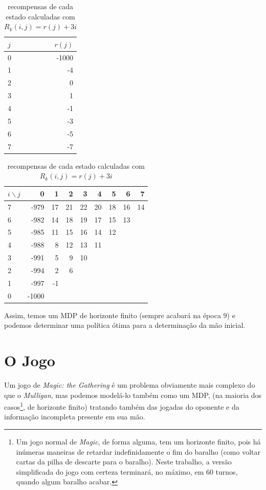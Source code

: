 \documentclass{book}
\begin{document}
\begin{table}[!h]
\parbox{.45\linewidth}{
\centering
\vspace{0.2cm}
\begin{tabular}{l|r}
$j$  & $r(j)$ \\ \hline
0 & -1000  \\
1 & -4     \\
2 & 0      \\
3 & 1      \\
4 & -1     \\
5 & -3    \\
6 & -5     \\
7 & -7
\end{tabular}
\caption{recompensas-base para $j = 0, \ldots, 7$}
\label{tab:rj}
}
\hfill
\parbox{.45\linewidth}{
\centering
\begin{tabular}{l|rrrrrrrr}
$i \backslash j$ & 0     & 1  & 2  & 3  & 4  & 5  & 6  & 7  \\ \hline
7 & -979  & 17 & 21 & 22 & 20 & 18 & 16 & 14 \\
6 & -982  & 14 & 18 & 19 & 17 & 15 & 13 &    \\
5 & -985  & 11 & 15 & 16 & 14 & 12 &    &    \\
4 & -988  & 8  & 12 & 13 & 11 &    &    &    \\
3 & -991  & 5  & 9  & 10 &    &    &    &    \\
2 & -994  & 2  & 6  &    &    &    &    &    \\
1 & -997  & -1 &    &    &    &    &    &    \\
0 & -1000 &    &    &    &    &    &    &
\end{tabular}
\caption{recompensas de cada estado calculadas com $R_k(i,j) = r(j) + 3i$}
\label{tab:Rij}
}
\end{table}
Assim, temos um MDP de horizonte finito (sempre acabará na época 9) e podemos determinar uma política ótima para a determinação da mão inicial.

\pagebreak

\section{O Jogo}

Um jogo de \textit{Magic: the Gathering} é um problema obviamente mais complexo do que o \textit{Mulligan}, mas podemos modelá-lo também como um MDP,
(na maioria dos casos\footnote{Um jogo normal de \textit{Magic}, de forma alguma, tem um horizonte finito, pois há
inúmeras maneiras de retardar indefinidamente o fim do baralho (como voltar cartas da pilha de descarte para o baralho). Neste trabalho, a versão
simplificada do jogo com certeza terminará, no máximo, em 60 turnos, quando algum baralho acabar.}, de horizonte finito) tratando também das jogadas do oponente e da informação incompleta presente em sua mão.
\end{document}
